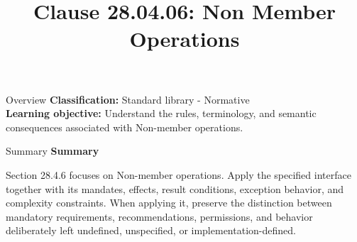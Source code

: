 \documentclass[10pt,letterpaper]{article}
\title{Clause 28.04.06: Non Member Operations}
\author{}
\date{}
\begin{document}
\maketitle
\begin{CornellOverviewBox}{Overview}
\textbf{Classification:} Standard library - Normative\\[2pt]
\textbf{Learning objective:} Understand the rules, terminology, and semantic consequences associated with Non-member operations.
\end{CornellOverviewBox}\begin{CornellSummaryBox}{Summary}
{\sffamily\bfseries\color{Accent} Summary}\par\vspace{3pt}Section 28.4.6 focuses on Non-member operations. Apply the specified interface together with its mandates, effects, result conditions, exception behavior, and complexity constraints. When applying it, preserve the distinction between mandatory requirements, recommendations, permissions, and behavior deliberately left undefined, unspecified, or implementation-defined.
\end{CornellSummaryBox}
\end{document}
